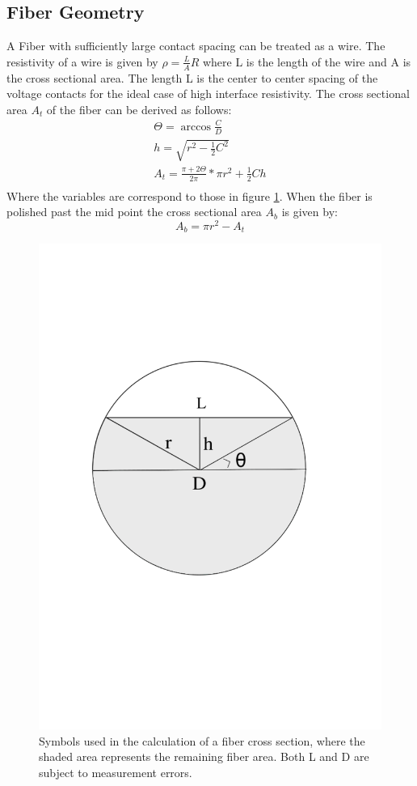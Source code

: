   
\subsection{Fiber Geometry}
A Fiber with sufficiently large contact spacing can be treated as a wire. The resistivity of a wire is given by $\rho = \frac{L}{A}R$
where L is the length of the wire and A is the cross sectional area. The length L is the center to center spacing of the voltage contacts for the ideal case of high interface resistivity. The cross sectional area $A_t$ of the fiber can be derived as follows: \begin{align}
\Theta = \arccos{\frac{C}{D}}    \\
h = \sqrt{r^2-\frac{1}{2}C^2} \\
    A_t = \frac{\pi+2\Theta}{2\pi}*\pi r^2 + \frac{1}{2}Ch\\
\end{align}    
Where the variables are correspond to those in figure \ref{fig:fiber}.
When the fiber is polished past the mid point the cross sectional area $A_b$ is given by: \begin{equation}
    A_b = \pi r^2 -A_t
\end{equation}

\begin{figure}
    \centering
    \includegraphics[width=.7\textwidth]{fig/polishing/fiberdiagram.jpg}
    \caption{Symbols used in the calculation of a fiber cross section, where the shaded area represents the remaining fiber area. Both L and D are subject to measurement errors.}
    \label{fig:fiber}
\end{figure}

